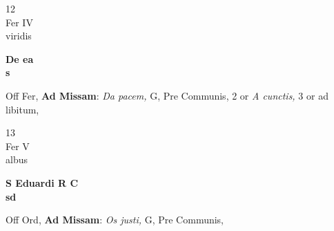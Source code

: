 \documentclass[10pt, openany]{book}
\begin{document}
        \begin{center}
            \begin{minipage}{3.5in}
                \vspace{2em}
                \begin{minipage}{0.5in}
                    {\Huge 12} \\
                    {\normalsize Fer IV} \\
                    {\normalsize viridis}
                \end{minipage}
                \begin{minipage}{3.0in}
                    \textbf{ \large De ea \\
                    \textnormal{\normalsize s}} \\ 
                \end{minipage}
                \begin{justify}Off Fer, \textbf{Ad Missam}: \textit{Da pacem,} G, Pre Communis, 2 or \textit{A cunctis,} 3 or ad libitum,  
                \end{justify}
            \end{minipage}
        \end{center}
    
        \begin{center}
            \begin{minipage}{3.5in}
                \vspace{2em}
                \begin{minipage}{0.5in}
                    {\Huge 13} \\
                    {\normalsize Fer V} \\
                    {\normalsize albus}
                \end{minipage}
                \begin{minipage}{3.0in}
                    \textbf{ \large S Eduardi R C \\
                    \textnormal{\normalsize sd}} \\ 
                \end{minipage}
                \begin{justify}Off Ord, \textbf{Ad Missam}: \textit{Os justi,} G, Pre Communis,  
                \end{justify}
            \end{minipage}
        \end{center}
    
\end{document}
